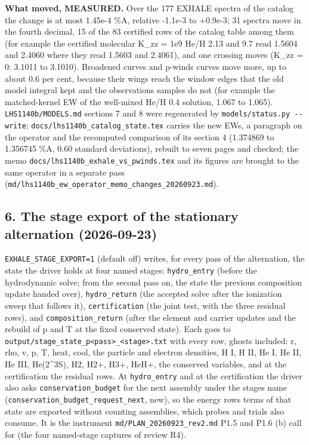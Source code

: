 \documentclass[english,a4paper]{my_memo}
\begin{document}
\textbf{What moved, MEASURED.} Over the 177 EXHALE spectra of the catalog the
change is at most 1.45e-4 \%A, relative -1.1e-3 to +0.9e-3; 31 spectra move in
the fourth decimal, 15 of the 83 certified rows of the catalog table among
them (for example the certified molecular K\_zz = 1e9 He/H 2.13 and 9.7 read
1.5604 and 2.4060 where they read 1.5603 and 2.4061), and one crossing moves
(K\_zz = 0: 3.1011 to 3.1010). Broadened curves and p-winds curves move more,
up to about 0.6 per cent, because their wings reach the window edges that the
old model integral kept and the observation\textquotesingle s samples do not (for example
the matched-kernel EW of the well-mixed He/H 0.4 solution, 1.067 to 1.065).
\texttt{LHS1140b/MODELS.md} sections 7 and 8 were regenerated by
\texttt{models/status.py\ -\/-write}; \texttt{docs/lhs1140b\_catalog\_state.tex} carries
the new EWs, a paragraph on the operator and the recomputed comparison of its
section 4 (1.374869 to 1.356745 \%A, 0.60 standard deviations), rebuilt to
seven pages and checked; the memo \texttt{docs/lhs1140b\_exhale\_vs\_pwinds.tex} and
its figures are brought to the same operator in a separate pass
(\texttt{md/lhs1140b\_ew\_operator\_memo\_changes\_20260923.md}).

\subsection{6. The stage export of the stationary alternation (2026-09-23)}\label{6-the-stage-export-of-the-stationary-alternation-2026-09-23}

\texttt{EXHALE\_STAGE\_EXPORT=1} (default off) writes, for every pass of the
alternation, the state the driver holds at four named stages:
\texttt{hydro\_entry} (before the hydrodynamic solve; from the second pass on, the
state the previous composition update handed over), \texttt{hydro\_return} (the
accepted solve after the ionization sweep that follows it), \texttt{certification}
(the joint test, with the three residual rows), and \texttt{composition\_return}
(after the element and carrier updates and the rebuild of p and T at the
fixed conserved state). Each goes to \texttt{output/stage\_state\_p\textless{}pass\textgreater{}\_\textless{}stage\textgreater{}.txt}
with every row, ghosts included: r, rho, v, p, T, heat, cool, the particle
and electron densities, H I, H II, He I, He II, He III, He(2\^{}3S), H2, H2+,
H3+, HeH+, the conserved variables, and at the certification the residual
rows. At \texttt{hydro\_entry} and at the certification the driver also asks
\texttt{conservation\_budget} for the next assembly under the stage\textquotesingle s name
(\texttt{conservation\_budget\_request\_next}, new), so the energy row\textquotesingle s terms of that
state are exported without counting assemblies, which probes and trials also
consume. It is the instrument \texttt{md/PLAN\_20260923\_rev2.md} P1.5 and P1.6 (b)
call for (the four named-stage captures of review R4).
\end{document}
